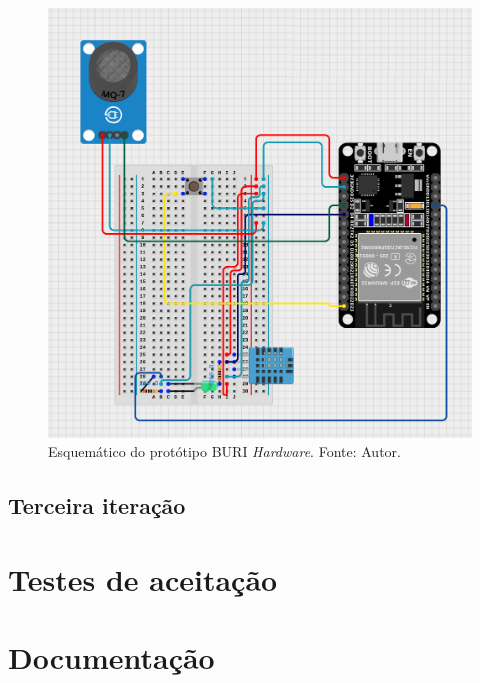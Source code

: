 \begin{figure}[ht]
    \centering
    \includegraphics[width=.68\textwidth]{img/buri_esquematico.png}
    \caption{Esquemático do protótipo BURI \textit{Hardware}. Fonte: Autor.}\label{figSchematicBuriHardware}
\end{figure}



\subsection{Terceira iteração}\label{ExecAtv3It}

\section{Testes de aceitação}\label{fase5}

\section{Documentação}\label{fase6}